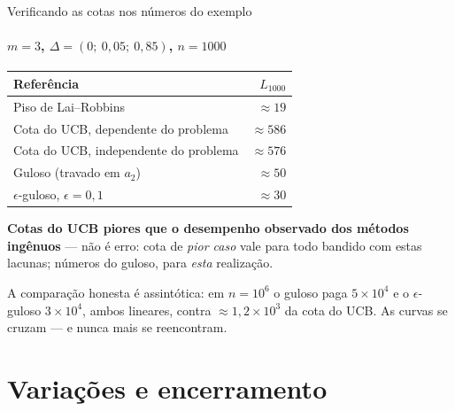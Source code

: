 \documentclass[aspectratio=169, 10pt]{beamer}
\newcommand{\gap}{\Delta}
\newcommand{\Reg}{L}
\begin{document}
\begin{frame}{Verificando as cotas nos números do exemplo}
  \framesubtitle{$m = 3$, $\gap = (0;\ 0{,}05;\ 0{,}85)$, $n = 1000$}

  \centering\small
  \begin{tabular}{lr}
    \toprule
    \textbf{Referência} & $\Reg_{1000}$ \\
    \midrule
    Piso de Lai--Robbins & $\approx 19$ \\
    Cota do UCB, dependente do problema & $\approx 586$ \\
    Cota do UCB, independente do problema & $\approx 576$ \\
    Guloso (travado em $a_2$) & $\approx 50$ \\
    $\epsilon$-guloso, $\epsilon = 0{,}1$ & $\approx 30$ \\
    \bottomrule
  \end{tabular}

  \vspace{0.8em}
  \vspace{-2mm}
  \begin{alertabox}[fontupper=\footnotesize]
    \textbf{Cotas do UCB piores que o desempenho observado dos métodos
    ingênuos} — não é erro: cota de \emph{pior caso} vale para todo bandido
    com estas lacunas; números do guloso, para \emph{esta} realização.
  \end{alertabox}
  \begin{ideiabox}[fontupper=\footnotesize]
    A comparação honesta é assintótica: em $n = 10^6$ o guloso paga
    $5\times10^4$ e o $\epsilon$-guloso $3\times10^4$, ambos lineares,
    contra $\approx 1{,}2\times10^3$ da cota do UCB. As curvas se cruzam ---
    e nunca mais se reencontram.
  \end{ideiabox}
\end{frame}

\section{Variações e encerramento}
\end{document}
